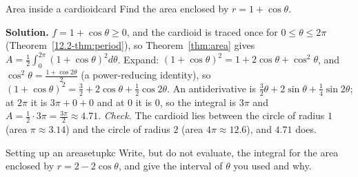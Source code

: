 \documentclass[11pt]{article}
\begin{document}
\begin{exmp}{Area inside a cardioid}{card}
Find the area enclosed by $r=1+\cos\theta$.

\textbf{Solution.} $f=1+\cos\theta\ge0$, and the cardioid is traced once for $0\le\theta\le2\pi$ (Theorem~\ref{12.2-thm:period}), so Theorem~\ref{thm:area} gives $A=\frac12\int_0^{2\pi}(1+\cos\theta)^2d\theta$. Expand: $(1+\cos\theta)^2=1+2\cos\theta+\cos^2\theta$, and $\cos^2\theta=\frac{1+\cos2\theta}2$ (a power-reducing identity), so $(1+\cos\theta)^2=\frac32+2\cos\theta+\frac12\cos2\theta$.
An antiderivative is $\frac32\theta+2\sin\theta+\frac14\sin2\theta$; at $2\pi$ it is $3\pi+0+0$ and at $0$ it is $0$, so the integral is $3\pi$ and $A=\frac12\cdot3\pi=\frac{3\pi}2\approx4.71$.
\emph{Check.} The cardioid lies between the circle of radius $1$ (area $\pi\approx3.14$) and the circle of radius $2$ (area $4\pi\approx12.6$), and $4.71$ does.

\begin{center}
\end{center}
\end{exmp}

\begin{kc}{Setting up an area}{setupkc}
Write, but do not evaluate, the integral for the area enclosed by $r=2-2\cos\theta$, and give the interval of $\theta$ you used and why.
\end{kc}
\end{document}
